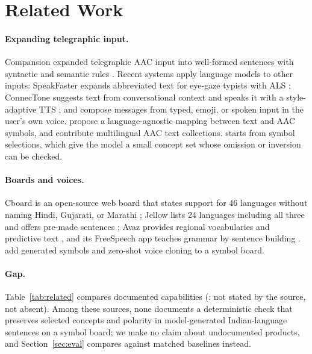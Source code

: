 \section{Related Work}
\label{sec:related}

\paragraph{Expanding telegraphic input.}
Compansion expanded telegraphic AAC input into well-formed sentences with syntactic and semantic rules \citep{mccoy1998compansion}.
Recent systems apply language models to other inputs: SpeakFaster expands abbreviated text for eye-gaze typists with ALS \citep{cai2024speakfaster}; ConnecTone suggests text from conversational context and speaks it with a style-adaptive TTS \citep{francis2024connectone}; and \citet{mohan2024composition} compose messages from typed, emoji, or spoken input in the user's own voice.
\citet{karmakar-sinha-2024-aiding} propose a language-agnostic mapping between text and AAC symbols, and \citet{vertanen2026multilingual} contribute multilingual AAC text collections.
\sys{} starts from symbol selections, which give the model a small concept set whose omission or inversion can be checked.

\paragraph{Boards and voices.}
Cboard is an open-source web board that states support for 46 languages without naming Hindi, Gujarati, or Marathi \citep{cboard}; Jellow lists 24 languages including all three and offers pre-made sentences \citep{jellow}; Avaz provides regional vocabularies and predictive text \citep{avaz}, and its FreeSpeech app teaches grammar by sentence building \citep{avazfreespeech}.
\citet{francis2025static} add generated symbols and zero-shot voice cloning to a symbol board.

\paragraph{Gap.}
Table~\ref{tab:related} compares documented capabilities (\nstated{}: not stated by the source, not absent).
Among these sources, none documents a deterministic check that preserves selected concepts and polarity in model-generated Indian-language sentences on a symbol board; we make no claim about undocumented products, and Section~\ref{sec:eval} compares against matched baselines instead.

